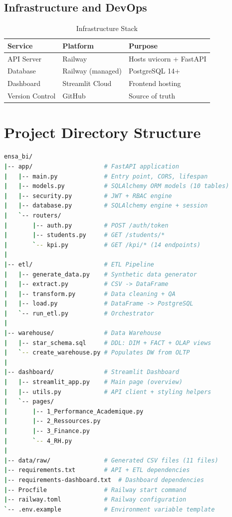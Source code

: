 \documentclass[12pt, a4paper]{report}
\begin{document}
\subsection{Infrastructure and DevOps}

\begin{table}[H]
\centering
\caption{Infrastructure Stack}
\label{tab:infra_stack}
\begin{tabular}{@{}lll@{}}
\toprule
\textbf{Service} & \textbf{Platform} & \textbf{Purpose} \\
\midrule
API Server       & Railway           & Hosts uvicorn + FastAPI \\
Database         & Railway (managed) & PostgreSQL 14+ \\
Dashboard        & Streamlit Cloud   & Frontend hosting \\
Version Control  & GitHub            & Source of truth \\
\bottomrule
\end{tabular}
\end{table}

\section{Project Directory Structure}

\begin{lstlisting}[language=bash, style=pythonstyle, caption={Project Directory Layout}]
ensa_bi/
|-- app/                    # FastAPI application
|   |-- main.py             # Entry point, CORS, lifespan
|   |-- models.py           # SQLAlchemy ORM models (10 tables)
|   |-- security.py         # JWT + RBAC engine
|   |-- database.py         # SQLAlchemy engine + session
|   `-- routers/
|       |-- auth.py         # POST /auth/token
|       |-- students.py     # GET /students/*
|       `-- kpi.py          # GET /kpi/* (14 endpoints)
|
|-- etl/                    # ETL Pipeline
|   |-- generate_data.py    # Synthetic data generator
|   |-- extract.py          # CSV -> DataFrame
|   |-- transform.py        # Data cleaning + QA
|   |-- load.py             # DataFrame -> PostgreSQL
|   `-- run_etl.py          # Orchestrator
|
|-- warehouse/              # Data Warehouse
|   |-- star_schema.sql     # DDL: DIM + FACT + OLAP views
|   `-- create_warehouse.py # Populates DW from OLTP
|
|-- dashboard/              # Streamlit Dashboard
|   |-- streamlit_app.py    # Main page (overview)
|   |-- utils.py            # API client + styling helpers
|   `-- pages/
|       |-- 1_Performance_Academique.py
|       |-- 2_Ressources.py
|       |-- 3_Finance.py
|       `-- 4_RH.py
|
|-- data/raw/               # Generated CSV files (11 files)
|-- requirements.txt        # API + ETL dependencies
|-- requirements-dashboard.txt  # Dashboard dependencies
|-- Procfile                # Railway start command
|-- railway.toml            # Railway configuration
`-- .env.example            # Environment variable template
\end{lstlisting}
\end{document}
